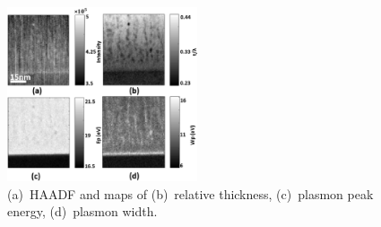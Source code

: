 \documentclass[%
 aip,
rsi,%
 amsmath,amssymb,
 reprint,%
]{revtex4-1}
\begin{document}
\begin{figure}
	\centering
    \includegraphics[width=0.5\textwidth]{combined_haadf}
    \caption{(a)~HAADF and maps of (b)~relative thickness, (c)~plasmon peak energy, (d)~plasmon width.}
    \label{fig:combined_haadf}
\end{figure}
\end{document}
